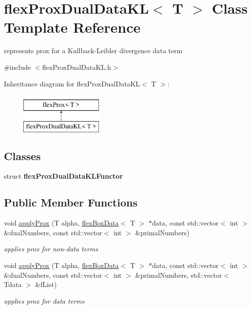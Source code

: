 \hypertarget{classflex_prox_dual_data_k_l}{}\section{flex\+Prox\+Dual\+Data\+KL$<$ T $>$ Class Template Reference}
\label{classflex_prox_dual_data_k_l}


represents prox for a Kullback-\/\+Leibler divergence data term  




{\ttfamily \#include $<$flex\+Prox\+Dual\+Data\+K\+L.\+h$>$}

Inheritance diagram for flex\+Prox\+Dual\+Data\+KL$<$ T $>$\+:\begin{figure}[H]
\begin{center}
\leavevmode
\includegraphics[height=2.000000cm]{classflex_prox_dual_data_k_l}
\end{center}
\end{figure}
\subsection*{Classes}
\begin{DoxyCompactItemize}
\item 
struct {\bfseries flex\+Prox\+Dual\+Data\+K\+L\+Functor}
\end{DoxyCompactItemize}
\subsection*{Public Member Functions}
\begin{DoxyCompactItemize}
\item 
void \hyperlink{classflex_prox_dual_data_k_l_ad6314cbdf307759e3176e26b3efba7c6}{apply\+Prox} (T alpha, \hyperlink{classflex_box_data}{flex\+Box\+Data}$<$ T $>$ $\ast$data, const std\+::vector$<$ int $>$ \&dual\+Numbers, const std\+::vector$<$ int $>$ \&primal\+Numbers)
\begin{DoxyCompactList}\small\item\em applies prox for non-\/data terms \end{DoxyCompactList}\item 
void \hyperlink{classflex_prox_dual_data_k_l_aa02947fd71697cdb7d6d7e0d617fdfc3}{apply\+Prox} (T alpha, \hyperlink{classflex_box_data}{flex\+Box\+Data}$<$ T $>$ $\ast$data, const std\+::vector$<$ int $>$ \&dual\+Numbers, const std\+::vector$<$ int $>$ \&primal\+Numbers, std\+::vector$<$ Tdata $>$ \&f\+List)
\begin{DoxyCompactList}\small\item\em applies prox for data terms \end{DoxyCompactList}\end{DoxyCompactItemize}
